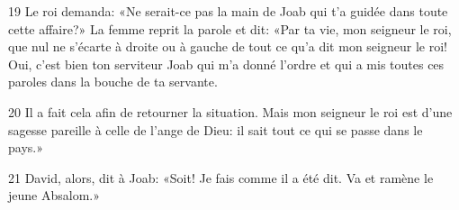 
19 Le roi demanda: «Ne serait-ce pas la main de Joab qui t’a guidée dans toute cette affaire?» La femme reprit la parole et dit: «Par ta vie, mon seigneur le roi, que nul ne s’écarte à droite ou à gauche de tout ce qu’a dit mon seigneur le roi! Oui, c’est bien ton serviteur Joab qui m’a donné l’ordre et qui a mis toutes ces paroles dans la bouche de ta servante.

20 Il a fait cela afin de retourner la situation. Mais mon seigneur le roi est d’une sagesse pareille à celle de l’ange de Dieu: il sait tout ce qui se passe dans le pays.»

21 David, alors, dit à Joab: «Soit! Je fais comme il a été dit. Va et ramène le jeune Absalom.»